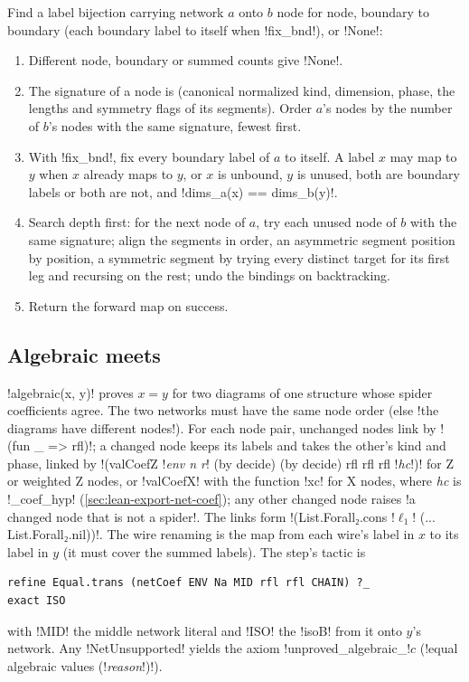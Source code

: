 {\begin{algorithm}\label{alg:lean-export-net-match}
Find a label bijection carrying network $a$ onto $b$ node for node, boundary to boundary (each
boundary label to itself when \py!fix_bnd!), or \py!None!:
\begin{enumerate}
\item Different node, boundary or summed counts give \py!None!.
\item The signature of a node is (canonical normalized kind, dimension, phase, the lengths and
  symmetry flags of its segments). Order $a$'s nodes by the number of $b$'s nodes with the same
  signature, fewest first.
\item With \py!fix_bnd!, fix every boundary label of $a$ to itself. A label $x$ may map to $y$
  when $x$ already maps to $y$, or $x$ is unbound, $y$ is unused, both are boundary labels or
  both are not, and \py!dims_a(x) == dims_b(y)!.
\item Search depth first: for the next node of $a$, try each unused node of $b$ with the same
  signature; align the segments in order, an asymmetric segment position by position, a
  symmetric segment by trying every distinct target for its first leg and recursing on the rest;
  undo the bindings on backtracking.
\item Return the forward map on success.
\end{enumerate}
\end{algorithm}

\subsection{Algebraic meets}\label{sec:lean-export-net-algebraic}

\py!algebraic(x, y)! proves $x = y$ for two diagrams of one structure whose spider coefficients
agree. The two networks must have the same node order (else \code!the diagrams have different nodes!).
For each node pair, unchanged nodes link by \code!(fun _ => rfl)!; a changed node keeps its
labels and takes the other's kind and phase, linked by
\code!(valCoefZ !\textit{env n r}\code! (by decide) (by decide) rfl rfl rfl !\textit{hc}\code!)!
for Z or weighted Z nodes, or \lean!valCoefX! with the function \lean!xc! for X nodes, where
\textit{hc} is \py!_coef_hyp! (\cref{sec:lean-export-net-coef}); any other changed node raises
\code!a changed node that is not a spider!. The links form
\code!(List.Forall₂.cons !$\ell_1$\code! (... List.Forall₂.nil))!. The wire renaming is the map
from each wire's label in $x$ to its label in $y$ (it must cover the summed labels). The step's
tactic is
\begin{lstlisting}[style=lean]
refine Equal.trans (netCoef ENV Na MID rfl rfl CHAIN) ?_
exact ISO
\end{lstlisting}
with \code!MID! the middle network literal and \code!ISO! the \lean!isoB! from it onto $y$'s
network. Any \py!NetUnsupported! yields the axiom \code!unproved_algebraic_!$c$
(\code!equal algebraic values (!\textit{reason}\code!)!).

}

